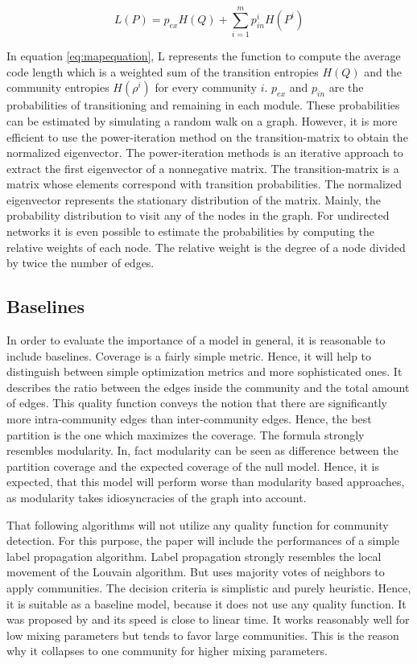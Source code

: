 \documentclass[11pt, twocolumn]{article}
\begin{document}
\begin{equation}
    \label{eq:mapequation}
    L(P) = p_{ex} H(Q) + \sum_{i=1}^m p_{in}^iH(P^i)
\end{equation}

In equation \autoref{eq:mapequation}, L represents the function to compute the average code length which is a weighted sum of the transition entropies $H(Q)$ and the community entropies $H(\rho^i)$ for every community $i$. $p_{ex}$ and $p_{in}$ are the probabilities of transitioning and remaining in each module. These probabilities can be estimated by simulating a random walk on a graph. However, it is more efficient to use the power-iteration method on the transition-matrix to obtain the normalized eigenvector. The power-iteration methods is an iterative approach to extract the first eigenvector of a nonnegative matrix. The transition-matrix is a matrix whose elements correspond with transition probabilities. The normalized eigenvector represents the stationary distribution of the matrix. Mainly, the probability distribution to visit any of the nodes in the graph. For undirected networks it is even possible to estimate the probabilities by computing the relative weights of each node. The relative weight is the degree of a node divided by twice the number of edges.            

\subsection{Baselines}
In order to evaluate the importance of a model in general, it is reasonable to include baselines. Coverage is a fairly simple metric. Hence, it will help to distinguish between simple optimization metrics and more sophisticated ones. It describes the ratio between the edges inside the community and the total amount of edges.\cite{fortunato_CommunityDetectionGraphs_2010} This quality function conveys the notion that there are significantly more intra-community edges than inter-community edges. Hence, the best partition is the one which maximizes the coverage. The formula strongly resembles modularity. In, fact modularity can be seen as difference between the partition coverage and the expected coverage of the null model. Hence, it is expected, that this model will perform worse than modularity based approaches, as modularity takes idiosyncracies of the graph into account.

That following algorithms will not utilize any quality function for community detection. For this purpose, the paper will include the performances of a simple label propagation algorithm. Label propagation strongly resembles the local movement of the Louvain algorithm. But uses majority votes of neighbors to apply communities. The decision criteria is simplistic and purely heuristic. Hence, it is suitable as a baseline model, because it does not use any quality function. It was proposed by \cite{raghavan_LinearTimeAlgorithm_2007} and its speed is close to linear time. It works reasonably well for low mixing parameters but tends to favor large communities. This is the reason why it collapses to one community for higher mixing parameters. 
\end{document}
